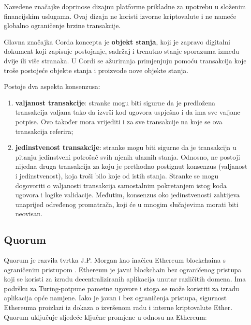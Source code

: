 \documentclass[times, utf8, diplomski]{fer}
\begin{document}
Navedene značajke doprinose dizajnu platforme prikladne za upotrebu u složenim  financijskim uslugama. Ovaj dizajn ne koristi izvorne kriptovalute i ne nameće globalno ograničenje brzine transakcije.

Glavna značajka Corda koncepta je \textbf{objekt stanja}, koji je zapravo digitalni dokument koji zapisuje postojanje, sadržaj i trenutno stanje sporazuma između dvije ili više stranaka. U Cordi se ažuriranja primjenjuju pomoću transakcija koje troše postojeće objekte stanja i proizvode nove objekte stanja. 

Postoje dva aspekta konsenzusa:

\begin{enumerate}

\item \textbf{valjanost transakcije}: stranke mogu biti sigurne da je predložena transakcija valjana tako da izvrši kod ugovora uspješno i da ima sve valjane potpise. Ovo također mora vrijediti i za sve transakcije na koje se ova transakcija referira;

\item \textbf{jedinstvenost transakcije}: stranke mogu biti sigurne da je transakcija u pitanju jedinstveni potrošač svih njenih ulaznih stanja. Odnosno, ne postoji nijedna druga transakcija za koju je prethodno postignut konsenzus (valjanost i jedinstvenost), koja troši bilo koje od istih stanja. Stranke se mogu dogovoriti o valjanosti transakcija samostalnim pokretanjem istog koda ugovora i logike validacije. Međutim, konsenzus oko jedinstvenosti zahtijeva unaprijed određenog promatrača,  koji će u mnogim slučajevima morati biti neovisan.

\end{enumerate}

\subsection{Quorum}

Quorum je razvila tvrtka J.P. Morgan kao inačicu Ethereum blockchaina s ograničenim pristupom \cite{Quorum}. Ethereum je javni blockchain bez ograničenog pristupa koji se koristi za izradu decentraliziranih aplikacija unutar različitih domena. Ima podršku za Turing-potpune pametne ugovore i stoga se može koristiti za izradu aplikacija opće namjene.  Iako je javan i bez ograničenja pristupa, sigurnost Ethereuma proizlazi iz dokaza o izvršenom radu i interne kriptovalute Ether. Quorum uključuje sljedeće ključne promjene u odnosu na Ethereum:
\end{document}
